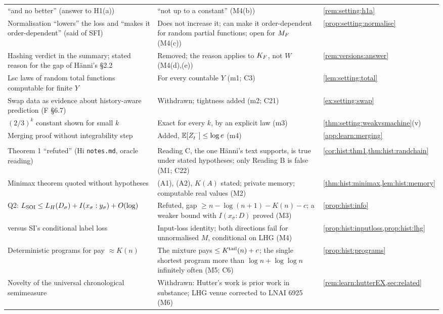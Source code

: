 {\begin{longtable}{@{}>{\raggedright\arraybackslash}p{5.1cm}>{\raggedright\arraybackslash}p{7.6cm}>{\raggedright\arraybackslash}p{2.6cm}@{}}
``and no better'' (answer to H1(a)) & ``not up to a constant'' (M4(b)) & \cref{rem:setting:h1a}\\
Normalisation ``lowers'' the loss and ``makes it order-dependent'' (said of SFI) & Does not increase it; can make it order-dependent for random partial functions; open for $M_{F}$ (M4(c)) & \cref{prop:setting:normalise}\\
Hashing verdict in the summary; stated reason for the gap of H\"anni's \S2.2 & Removed; the reason applies to $K_{F}$, not $W$ (M4(d),(e)) & \cref{rem:versions:answer}\\
Lsc laws of random total functions computable for finite $Y$ & For every countable $Y$ (m1; C3) & \cref{lem:setting:total}\\
Swap data as evidence about history-aware prediction (F \S6.7) & Withdrawn; tightness added (m2; C21) & \cref{ex:setting:swap}\\
$(2/3)^k$ constant shown for small $k$ & Exact for every $k$, by an explicit law (m3) & \cref{thm:setting:weakvsmachine}(v)\\
Merging proof without integrability step & Added, $\mathbb{E}[Z_t^-]\le\log e$ (m4) & \cref{app:learn:merging}\\
\multicolumn{3}{@{}l}{\emph{History}}\\
Theorem 1 ``refuted'' (Hi \texttt{notes.md}, oracle reading) & Reading C, the one H\"anni's text supports, is true under stated hypotheses; only Reading B is false (M1; C22) & \cref{cor:hist:thm1,thm:hist:randchain}\\
Minimax theorem quoted without hypotheses & (A1), (A2), $K(A)$ stated; private memory; computable real values (M2) & \cref{thm:hist:minimax,lem:hist:memory}\\
Q2: $L_{\mathrm{SOI}}\le L_{H}(D_\sigma)+I(x_\sigma:y_\sigma)+O(\log)$ & Refuted, gap $\ge n-\log(n+1)-K(n)-c$; a weaker bound with $I(x_\sigma:D)$ proved (M3) & \cref{prop:hist:info}\\
\SFIhist{} versus SI's conditional label loss & Input-loss identity; both directions fail for unnormalised $M$, conditional on LHG (M4) & \cref{prop:hist:inputloss,prop:hist:lhg}\\
Deterministic programs for \SFIhist{} pay $\approx K(n)$ & The mixture pays $\le K^{\mathrm{tail}}(n)+c$; the single shortest program more than $\log n+\log\log n$ infinitely often (M5; C6) & \cref{prop:hist:programs}\\
Novelty of the universal chronological semimeasure & Withdrawn: Hutter's work is prior work in substance; LHG venue corrected to LNAI 6925 (M6) & \cref{rem:learn:hutterEX,sec:related}\\

\end{longtable}}
